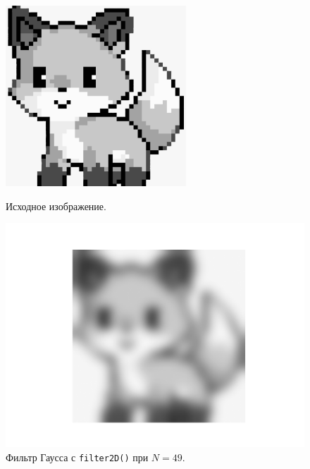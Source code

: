 \documentclass[a4paper]{article}
\begin{document}
\begin{figure}[H]
  \centering
  \begin{minipage}{0.49\textwidth}
    \centering
    \includegraphics[width=\textwidth]{src/grayscale.png}
    \caption{Исходное изображение.}  
  \end{minipage}
  \begin{minipage}{0.49\textwidth}
    \centering
    \includegraphics[width=\textwidth]{src/gauss_49.png}
    \caption{Фильтр Гаусса с \texttt{filter2D()} при $N=49$.}
  \end{minipage}
\end{figure}
\end{document}
